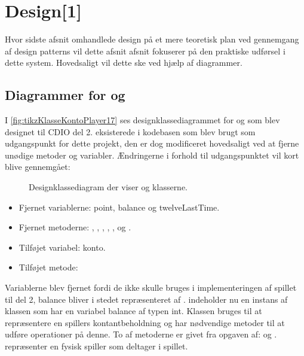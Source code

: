 \chapter{Design[1]}\label{chap:design}

Hvor sidste afsnit omhandlede design på et mere teoretisk plan ved gennemgang af design patterns vil dette afsnit afsnit fokuserer på den praktiske udførsel i dette system. Hovedsaligt vil dette ske ved hjælp af diagrammer.

\section{Diagrammer for  og }\label{sec:diagPlayerKonto}

I \vref{fig:tikzKlasseKontoPlayer17} ses designklassediagrammet for  og  som blev designet til CDIO del 2.  eksisterede i kodebasen som blev brugt som udgangspunkt for dette projekt, den er dog modificeret hovedsaligt ved at fjerne unødige metoder og variabler. Ændringerne i forhold til udgangspunktet vil kort blive gennemgået:

\begin{figure}
\caption{Designklassediagram der viser  og  klasserne.}\label{fig:tikzKlasseKontoPlayer17}
\centering

\end{figure}

\begin{itemize}
\item Fjernet variablerne: point, balance og twelveLastTime.
\item Fjernet metoderne: , , , , ,  og .
\item Tilføjet variabel: konto.
\item Tilføjet metode: 
\end{itemize}

Variablerne blev fjernet fordi de ikke skulle bruges i implementeringen af spillet til del 2, balance bliver i stedet repræsenteret af .  indeholder nu en instans af klassen  som har en variabel balance af typen int. Klassen bruges til at repræsentere en spillers kontantbeholdning og har nødvendige metoder til at udføre operationer på denne. To af metoderne er givet fra opgaven af:  og .  repræsenter en fysisk spiller som deltager i spillet.

